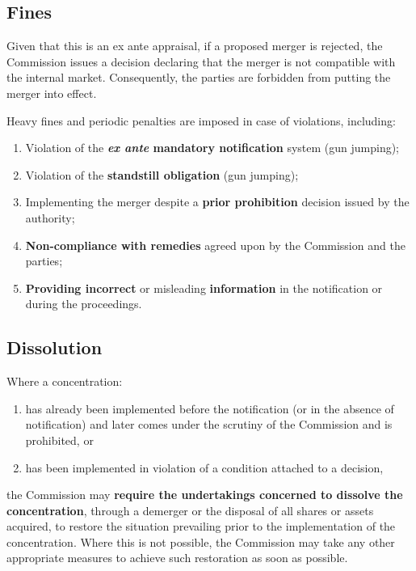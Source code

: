 
    \subsection{Fines}

        Given that this is an ex ante appraisal, if a proposed merger is rejected, the Commission issues a decision declaring that the merger is not compatible with the internal market. Consequently, the parties are forbidden from putting the merger into effect.
    
        Heavy fines and periodic penalties are imposed in case of violations, including:
        \begin{enumerate}
            \item Violation of the\textbf{ \textit{ex ante} mandatory notification} system (gun jumping);
            \item Violation of the \textbf{standstill obligation} (gun jumping);
            \item Implementing the merger despite a \textbf{prior prohibition} decision issued by the authority;
            \item \textbf{Non-compliance with remedies} agreed upon by the Commission and the parties;
            \item \textbf{Providing incorrect} or misleading \textbf{information} in the notification or during the proceedings.
        \end{enumerate}

    \subsection{Dissolution}

        Where a concentration:
        \begin{enumerate}[label=\alph*.]
            \item has already been implemented before the notification (or in the absence of notification) and later comes under the scrutiny of the Commission and is prohibited, or
            \item has been implemented in violation of a condition attached to a decision,
        \end{enumerate}
        the Commission may \textbf{require the undertakings concerned to dissolve the concentration}, through a demerger or the disposal of all shares or assets acquired, to restore the situation prevailing prior to the implementation of the concentration. Where this is not possible, the Commission may take any other appropriate measures to achieve such restoration as soon as possible.
    
